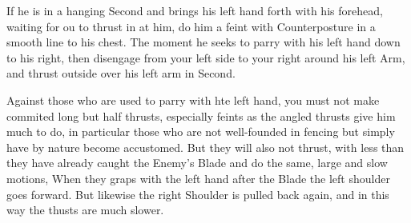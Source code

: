 \exercise{}

If he is in a hanging Second and brings his left hand forth with his forehead, waiting for ou to thrust in at him, do him a feint with Counterposture in a smooth line to his chest. The moment he seeks to parry with his left hand down to his right, then disengage from your left side to your right around his left Arm, and thrust outside over his left arm in Second.

\exercise{}

Against those who are used to parry with hte left hand, you must not make commited long but half thrusts, especially feints as the angled thrusts give him much to do, in particular those who are not well-founded in fencing but simply have by nature become accustomed. But they will also not thrust, with less than they have already caught the Enemy's Blade and do the same, large and slow motions, When they graps with the left hand after the Blade the left shoulder goes forward. But likewise the right Shoulder is pulled back again, and in this way the thusts are much slower.
